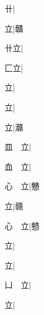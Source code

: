 \begin{multicols}{2}
{{\cjk{}{\cnsym{}　}{\cnsym{}　}卄}|{}\par
{\cjk{}{\cnsym{}　}{\cnsym{}　}立}|{\cjk{}贛}\par
{\cjk{}{\cnsym{}　}卄立}|{}\par
{\cjk{}{\cnsym{}　}匚立}|{}\par
{立}|{}\par
{立}|{}\par
{立}|{\cjk{}灨}\par
{\cjk{}皿{\cnsym{}　}立}|{}\par
{\cjk{}血{\cnsym{}　}立}|{}\par
{\cjk{}心{\cnsym{}　}立}|{\cjk{}戇}\par
{\cjk{}{\cnsym{}　}{\cnsym{}　}立}|{\cjk{}赣}\par
{\cjk{}心{\cnsym{}　}立}|{\cjk{}戆}\par
{\cjk{}{\cnsym{}　}{\cnsym{}　}立}|{}\par
{\cjk{}{\cnsym{}　}{\cnsym{}　}立}|{}\par
{\cjk{}凵{\cnsym{}　}立}|{}\par
{\cjk{}{\cnsym{}　}{\cnsym{}　}立}|{}\par
}
\end{multicols}
